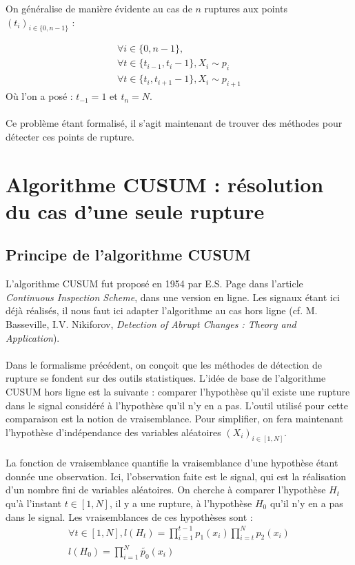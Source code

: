 \documentclass[french,12pt,notitlepage]{report}
\begin{document}
	On généralise de manière évidente au cas de $n$ ruptures aux points $(t_i)_{i \in \{0, n-1\}}$ :
	
	\begin{equation}
	\begin{array}{lll}
		\forall i \in \{0, n-1\}, \\
		\forall t \in \{t_{i-1}, t_i-1\}, X_i \sim p_i \\
		\forall t \in \{t_i, t_{i+1}-1\}, X_i \sim p_{i+1}
	\end{array}
	\end{equation}
	Où l'on a posé : $t_{-1} = 1$ et $t_n = N$.
	\\ \\
	Ce problème étant formalisé, il s'agit maintenant de trouver des méthodes pour détecter ces points de rupture.
	
	\chapter{Algorithme CUSUM : résolution du cas d'une seule rupture}
	
	
	\section{Principe de l'algorithme CUSUM}
	L'algorithme CUSUM fut proposé en 1954 par E.S. Page dans l'article \textit{Continuous Inspection Scheme}, dans une version en ligne. Les signaux étant ici déjà réalisés, il nous faut ici adapter l'algorithme au cas hors ligne (cf. M. Basseville, I.V. Nikiforov, \textit{Detection of Abrupt Changes : Theory and Application}).
	\\ \\
	Dans le formalisme précédent, on conçoit que les méthodes de détection de rupture se fondent sur des outils statistiques. L'idée de base de l'algorithme CUSUM hors ligne est la suivante : comparer l'hypothèse qu'il existe une rupture dans le signal considéré à l'hypothèse qu'il n'y en a pas. L'outil utilisé pour cette comparaison est la notion de vraisemblance. Pour simplifier, on fera maintenant l'hypothèse d'indépendance des variables aléatoires $(X_i)_{i \in [1,N]}$.
	\\ \\
	La fonction de vraisemblance quantifie la vraisemblance d'une hypothèse étant donnée une observation. Ici, l'observation faite est le signal, qui est la réalisation d'un nombre fini de variables aléatoires. On cherche à comparer l'hypothèse $H_t$ qu'à l'instant $t \in [1, N]$, il y a une rupture, à l'hypothèse $H_0$ qu'il n'y en a pas dans le signal. Les vraisemblances de ces hypothèses sont :
	\begin{equation}
	\begin{array}{ll}
		\forall t \in [1, N],l(H_t) = \prod_{i = 1}^{t-1} p_1(x_i) \prod_{i = t}^{N} p_2(x_i) \\
		l(H_0) = \prod_{i = 1}^N \tilde{p_0}(x_i) \\
	\end{array}	
	\end{equation}
	
\end{document}
